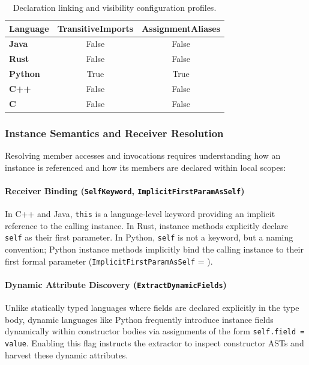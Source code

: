 \begin{table}[htbp]
  \centering
  \small
  \begin{tabular}{|l|c|c|}
    \hline
    \textbf{Language} & \textbf{TransitiveImports} &
    \textbf{AssignmentAliases} \\ \hline
    \textbf{Java}     & False & False \\ \hline
    \textbf{Rust}     & False & False \\ \hline
    \textbf{Python}   & True  & True  \\ \hline
    \textbf{C++}      & False & False \\ \hline
    \textbf{C}        & False & False \\ \hline
  \end{tabular}
  \caption{Declaration linking and visibility configuration profiles.}
  \label{tab:lang_config_decl}
\end{table}

\subsubsection{Instance Semantics and Receiver Resolution}

Resolving member accesses and invocations requires understanding how an
instance is referenced and how its members are declared within local scopes:

\paragraph{Receiver Binding (\texttt{SelfKeyword},
\texttt{ImplicitFirstParamAsSelf})}
In C++ and Java, \texttt{this} is a language-level keyword providing an
implicit reference to the calling instance. In Rust, instance methods
explicitly declare \texttt{self} as their first parameter. In Python,
\texttt{self} is not a keyword, but a naming convention; Python instance
methods implicitly bind the calling instance to their first formal parameter
(\texttt{ImplicitFirstParamAsSelf} = ).

\paragraph{Dynamic Attribute Discovery (\texttt{ExtractDynamicFields})}
Unlike statically typed languages where fields are declared explicitly in the
type body, dynamic languages like Python frequently introduce instance fields
dynamically within constructor bodies via assignments of the form
\texttt{self.field = value}. Enabling this flag instructs the extractor to
inspect constructor ASTs and harvest these dynamic attributes.

